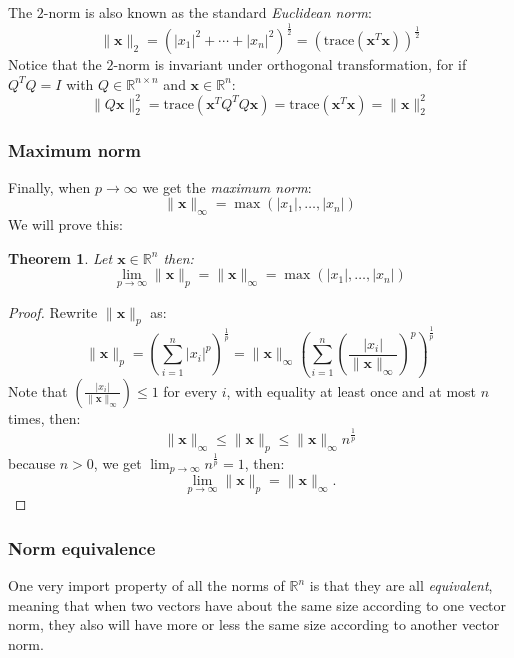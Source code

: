 \documentclass[a4paper,11pt]{report}
\newtheorem{theorem}{Theorem}[section]
\newcommand{\R}{{\mathbb R}}
\begin{document}
The $2$-norm is also known as the standard \emph{Euclidean norm}:
$$\|\mathbf{x}\|_2 = (|x_1|^2+  \cdots + |x_n|^2)^{\frac{1}{2}} = (\text{trace}(\mathbf{x}^T \mathbf{x}))^{\frac{1}{2}}$$
Notice that the $2$-norm is invariant under orthogonal transformation, for if 
$Q^TQ = I$ with $Q \in \R^{n\times n}$ and $\mathbf{x} \in \R^n$:
$$\|Q\mathbf{x}\|^2_2 = \text{trace}(\mathbf{x}^TQ^TQ\mathbf{x}) = \text{trace}(\mathbf{x}^T\mathbf{x}) = 
\|\mathbf{x}\|^2_2$$

\subsubsection{Maximum norm}
Finally, when $p \to \infty$ we get the \emph{maximum norm}:
$$\|\mathbf{x}\|_\infty = \max(|x_1|, \ldots, |x_n|)$$ 
We will prove this:
\begin{theorem}
  Let $\mathbf{x} \in \R^n$ then:
  $$\lim_{p\to \infty}\|\mathbf{x}\|_p = \|\mathbf{x}\|_\infty =\max(|x_1|, \ldots, |x_n|)$$
\end{theorem}
\begin{proof}
  Rewrite $\|\mathbf{x}\|_p$ as:
  $$\|\mathbf{x}\|_p = \left(\sum^n_{i=1} |x_i|^p \right)^{\frac{1}{p}} = \|\mathbf{x}\|_\infty 
  \left(\sum^n_{i=1} \left(\frac{|x_i|}{\|\mathbf{x}\|_\infty} \right)^p \right)^{\frac{1}{p}}$$
  Note that $\left(\frac{|x_i|}{\|\mathbf{x}\|_\infty}\right) \leq 1$ for every $i$, with equality at least once and
  at most $n$ times, then:
  $$\|\mathbf{x}\|_\infty \leq \|\mathbf{x}\|_p \leq \|\mathbf{x}\|_\infty n^{\frac{1}{p}}$$ 
  because $n > 0$, we get $\lim_{p\to \infty} n^{\frac{1}{p}} = 1$, then:
  $$\lim_{p\to\infty} \|\mathbf{x}\|_p = \|\mathbf{x}\|_\infty.$$
\end{proof}

\subsubsection{Norm equivalence}

One very import property of all the norms of $\R^n$ is that they are all 
\emph{equivalent}, meaning that when two vectors have about the same size according to one vector norm, they also
will have more or less the same size according to another vector norm. 
\end{document}
